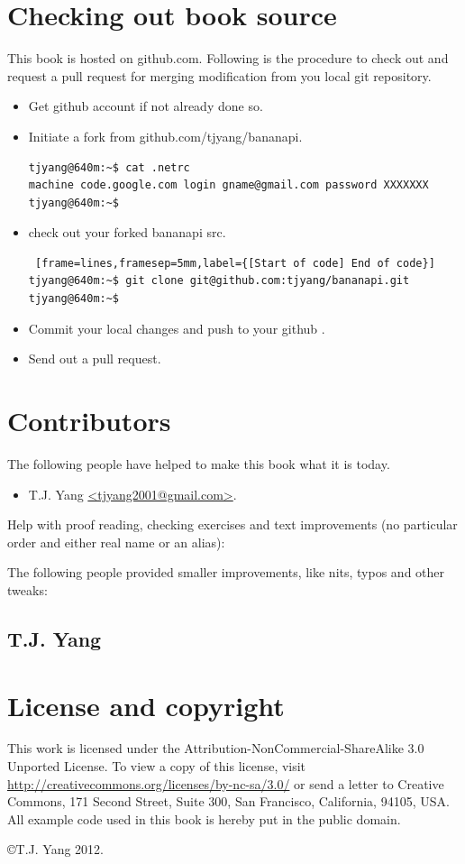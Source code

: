 \section{Checking out book source}
This book is hosted on github.com. Following is the procedure to check out and request a pull request for merging  modification from you local git repository.
\begin{itemize}
\item{Get github account if not already done so}.
\item{Initiate a fork from github.com/tjyang/bananapi}.
\begin{lstlisting}[language=Bash]
tjyang@640m:~$ cat .netrc
machine code.google.com login gname@gmail.com password XXXXXXX
tjyang@640m:~$ 
\end{lstlisting}

\item{check out your forked bananapi src}.
\begin{Verbatim} [frame=lines,framesep=5mm,label={[Start of code] End of code}]
tjyang@640m:~$ git clone git@github.com:tjyang/bananapi.git 
tjyang@640m:~$ 
\end{Verbatim}

\item{Commit your local changes and push to your github }.
\item{Send out a pull request}.

\end{itemize}


\section{Contributors}
The following people have helped to make this book what it is today.
\begin{itemize}
\item{T.J. Yang \qquad\url{<tjyang2001@gmail.com>}}.
\end{itemize}

Help with proof reading, checking exercises and text improvements (no
particular order and either real name or an alias):


The following people provided smaller improvements, like nits, typos and
other tweaks:


\subsection{T.J. Yang}


\section{License and copyright}
This work is licensed under the Attribution-NonCommercial-ShareAlike 3.0 Unported License. To
view a copy of this license, visit \url{http://creativecommons.org/licenses/by-nc-sa/3.0/}
or send a letter to Creative Commons, 171 Second Street, Suite 300, San
Francisco, California, 94105, USA.\newline
All example code used in this book is hereby put in the public domain.

\copyright T.J. Yang 2012.
